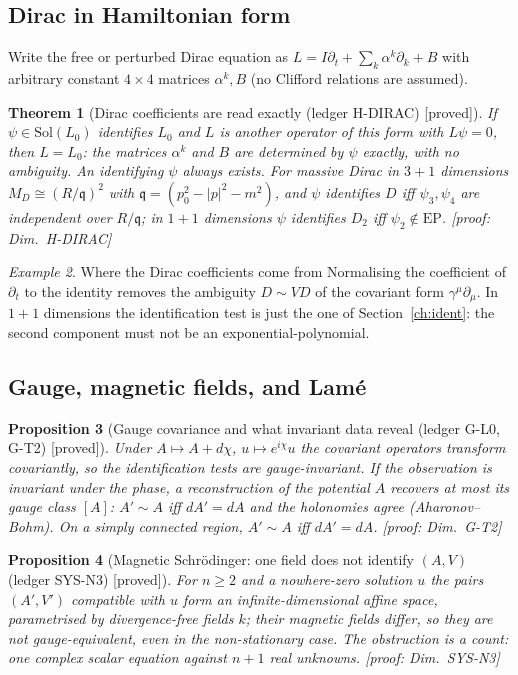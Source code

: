 \documentclass[11pt]{article}
\theoremstyle{plain}
\newtheorem{theorem}{Theorem}[section]
\newtheorem{proposition}[theorem]{Proposition}
\theoremstyle{definition}
\theoremstyle{remark}
\newtheorem{example}[theorem]{Example}
\newcommand{\EP}{\mathrm{EP}}               %
\newcommand{\badge}[2]{\textcolor{#1}{\textsf{\footnotesize[#2]}}}
\newcommand{\proved}[1][]{\badge{cC}{proved#1}}
\newcommand{\led}[1]{\textcolor{cG}{\textsf{\footnotesize(ledger #1)}}}
\newcommand{\dimref}[1]{\textsf{\footnotesize[proof: Dim.~#1]}}
\begin{document}
\subsection{Dirac in Hamiltonian form}

Write the free or perturbed Dirac equation as $L=I\partial_t+\sum_k\alpha^k\partial_k+B$ with arbitrary constant $4\times4$ matrices $\alpha^k,B$ (no Clifford relations are assumed).

\begin{theorem}[{Dirac coefficients are read exactly \led{H-DIRAC} \proved}]\label{thm:hdirac}
If $\psi\in\mathrm{Sol}(L_0)$ identifies $L_0$ and $L$ is another operator of this form with $L\psi=0$, then $L=L_0$: the matrices $\alpha^k$ and $B$ are determined by $\psi$ exactly, with no ambiguity. An identifying $\psi$ always exists. For massive Dirac in $3+1$ dimensions $M_D\cong(R/\mathfrak q)^{2}$ with $\mathfrak q=(p_0^2-|p|^2-m^2)$, and $\psi$ identifies $D$ iff $\psi_3,\psi_4$ are independent over $R/\mathfrak q$; in $1+1$ dimensions $\psi$ identifies $D_2$ iff $\psi_2\notin\EP$.
\dimref{H-DIRAC}
\end{theorem}

\begin{example}{Where the Dirac coefficients come from}
Normalising the coefficient of $\partial_t$ to the identity removes the ambiguity $D\sim VD$ of the covariant form $\gamma^\mu\partial_\mu$. In $1+1$ dimensions the identification test is just the one of Section~\ref{ch:ident}: the second component must not be an exponential-polynomial.
\end{example}

\subsection{Gauge, magnetic fields, and Lam\'e}

\begin{proposition}[{Gauge covariance and what invariant data reveal \led{G-L0, G-T2} \proved}]\label{prop:gauge}
Under $A\mapsto A+d\chi$, $u\mapsto e^{i\chi}u$ the covariant operators transform covariantly, so the identification tests are gauge-invariant. If the observation is invariant under the phase, a reconstruction of the potential $A$ recovers at most its gauge class $[A]$: $A'\sim A$ iff $dA'=dA$ and the holonomies agree (Aharonov--Bohm). On a simply connected region, $A'\sim A$ iff $dA'=dA$.
\dimref{G-T2}
\end{proposition}

\begin{proposition}[{Magnetic Schr\"odinger: one field does not identify $(A,V)$ \led{SYS-N3} \proved}]\label{prop:sysn3}
For $n\ge2$ and a nowhere-zero solution $u$ the pairs $(A',V')$ compatible with $u$ form an infinite-dimensional affine space, parametrised by divergence-free fields $k$; their magnetic fields differ, so they are not gauge-equivalent, even in the non-stationary case. The obstruction is a count: one complex scalar equation against $n+1$ real unknowns.
\dimref{SYS-N3}
\end{proposition}
\end{document}
